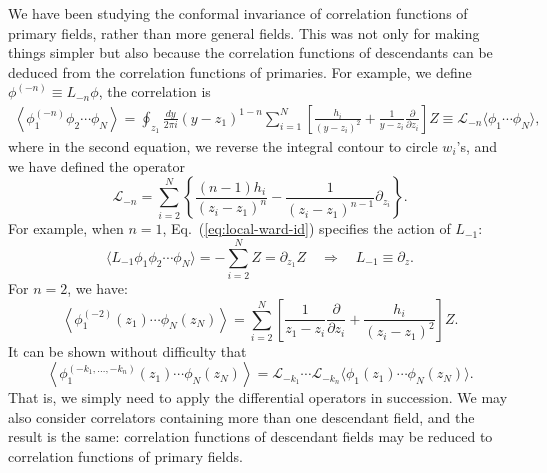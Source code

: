 \documentclass[aps,prb,superscriptaddress,nofootinbib]{revtex4}
\begin{document}
We have been studying the conformal invariance of correlation functions of primary fields, rather than more general fields. 
This was not only for making things simpler but also because the correlation functions of descendants can be deduced from the correlation functions of primaries.
For example, we define $\phi^{(-n)}\equiv L_{-n}\phi$, the correlation is
\begin{equation}
\begin{aligned}
	\left\langle \phi_1^{(-n)} \phi_2\cdots \phi_N\right\rangle
	= \oint_{z_1} \frac{d y}{2\pi i}(y-z_1)^{1-n} \sum_{i=1}^N\left[\frac{h_i}{\left(y-z_i\right)^2}+\frac{1}{y-z_i} \frac{\partial}{\partial z_i}\right] Z 
	\equiv \mathcal{L}_{-n}\langle\phi_1 \cdots \phi_N\rangle,
\end{aligned}
\end{equation}
where in the second equation, we reverse the integral contour to circle $w_i$'s, and we have defined the operator
\begin{equation}\label{eq:local-ward-id}
	\mathcal{L}_{-n}=\sum_{i=2}^N\left\{\frac{(n-1) h_{i}}{\left(z_{i}-z_1\right)^{n}}-\frac{1}{\left(z_{i}-z_1\right)^{n-1}} \partial_{z_{i}}\right\}.
\end{equation}
For example, when $n=1$, Eq.~(\ref{eq:local-ward-id}) specifies the action of $L_{-1}$:
\begin{equation}
	\langle L_{-1}\phi_1 \phi_2\cdots\phi_N\rangle 
	= -\sum_{i=2}^N Z = \partial_{z_1}Z \quad\Longrightarrow\quad
	L_{-1} \equiv \partial_z.
\end{equation}
For $n=2$, we have:
\begin{equation}
	\left\langle \phi^{(-2)}_{1}(z_1) \cdots \phi_{N}(z_N) \right\rangle
	=\sum_{i=2}^N\left[\frac{1}{z_1-z_i} \frac{\partial}{\partial z_i}+\frac{h_i}{\left(z_i-z_1\right)^2}\right] Z.
\end{equation}
It can be shown without difficulty that
\begin{equation}
	\left\langle\phi^{\left(-k_{1}, \ldots,-k_{n}\right)}_1(z_1)\cdots \phi_N(z_N)\right\rangle=\mathcal{L}_{-k_{1}} \cdots \mathcal{L}_{-k_{n}}\langle\phi_1(z_1)\cdots \phi_N(z_N)\rangle.
\end{equation}
That is, we simply need to apply the differential operators in succession. 
We may also consider correlators containing more than one descendant field, and the result is the same: correlation functions of descendant fields may be reduced to correlation functions of primary fields.
\end{document}
